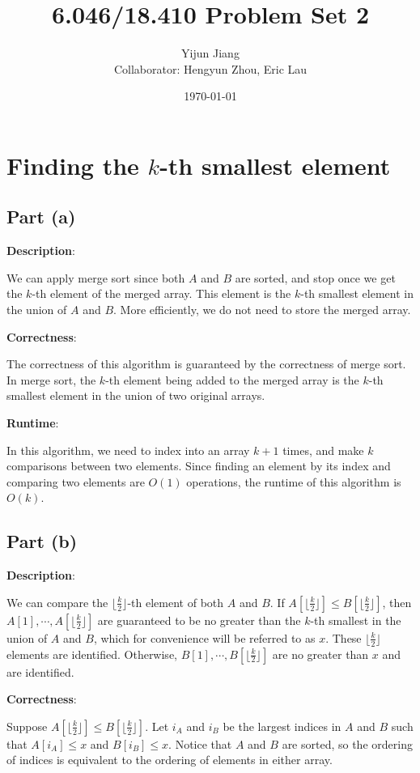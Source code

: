 \documentclass{article}
\title{6.046/18.410 Problem Set 2}
\author{Yijun Jiang\vspace{3pt}\\Collaborator: Hengyun Zhou, Eric Lau}
\date{\today}
\begin{document}
\maketitle

\section{Finding the $k$-th smallest element}
\subsection{Part (a)}
\noindent\textbf{Description}:

We can apply merge sort since both $A$ and $B$ are sorted, and stop once we get the $k$-th element of the merged array. This element is the $k$-th smallest element in the union of $A$ and $B$. More efficiently, we do not need to store the merged array.

\noindent\textbf{Correctness}:

The correctness of this algorithm is guaranteed by the correctness of merge sort. In merge sort, the $k$-th element being added to the merged array is the $k$-th smallest element in the union of two original arrays.

\noindent\textbf{Runtime}:

In this algorithm, we need to index into an array $k+1$ times, and make $k$ comparisons between two elements. Since finding an element by its index and comparing two elements are $O(1)$ operations, the runtime of this algorithm is $O(k)$.

\subsection{Part (b)}
\noindent\textbf{Description}:

We can compare the $\lfloor\frac{k}{2}\rfloor$-th element of both $A$ and $B$. If $A[\lfloor\frac{k}{2}\rfloor]\leqslant B[\lfloor\frac{k}{2}\rfloor]$, then $A[1],\cdots,A[\lfloor\frac{k}{2}\rfloor]$ are guaranteed to be no greater than the $k$-th smallest in the union of $A$ and $B$, which for convenience will be referred to as $x$. These $\lfloor\frac{k}{2}\rfloor$ elements are identified. Otherwise, $B[1],\cdots,B[\lfloor\frac{k}{2}\rfloor]$ are no greater than $x$ and are identified.

\noindent\textbf{Correctness}:

Suppose $A[\lfloor\frac{k}{2}\rfloor]\leqslant B[\lfloor\frac{k}{2}\rfloor]$. Let $i_A$ and $i_B$ be the largest indices in $A$ and $B$ such that $A[i_A]\leqslant x$ and $B[i_B]\leqslant x$. Notice that $A$ and $B$ are sorted, so the ordering of indices is equivalent to the ordering of elements in either array.
\end{document}
